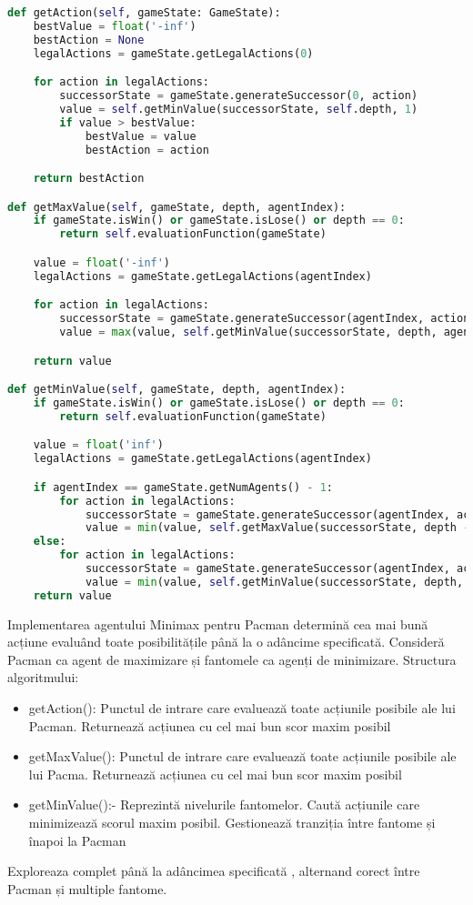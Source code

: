 \documentclass[12pt,a4paper]{article}
\begin{document}
\begin{lstlisting}[language=Python]
def getAction(self, gameState: GameState):
    bestValue = float('-inf')
    bestAction = None
    legalActions = gameState.getLegalActions(0)

    for action in legalActions:
        successorState = gameState.generateSuccessor(0, action)
        value = self.getMinValue(successorState, self.depth, 1)
        if value > bestValue:
            bestValue = value
            bestAction = action

    return bestAction

def getMaxValue(self, gameState, depth, agentIndex):
    if gameState.isWin() or gameState.isLose() or depth == 0:
        return self.evaluationFunction(gameState)

    value = float('-inf')
    legalActions = gameState.getLegalActions(agentIndex)

    for action in legalActions:
        successorState = gameState.generateSuccessor(agentIndex, action)
        value = max(value, self.getMinValue(successorState, depth, agentIndex + 1))

    return value

def getMinValue(self, gameState, depth, agentIndex):
    if gameState.isWin() or gameState.isLose() or depth == 0:
        return self.evaluationFunction(gameState)

    value = float('inf')
    legalActions = gameState.getLegalActions(agentIndex)

    if agentIndex == gameState.getNumAgents() - 1:
        for action in legalActions:
            successorState = gameState.generateSuccessor(agentIndex, action)
            value = min(value, self.getMaxValue(successorState, depth - 1, 0))
    else:
        for action in legalActions:
            successorState = gameState.generateSuccessor(agentIndex, action)
            value = min(value, self.getMinValue(successorState, depth, agentIndex + 1))
    return value
\end{lstlisting}

Implementarea agentului Minimax pentru Pacman determină cea mai bună acțiune evaluând toate 
posibilitățile până la o adâncime specificată. Consideră Pacman ca agent de maximizare și 
fantomele ca agenți de minimizare.
Structura algoritmului:
\begin{itemize}
    \item getAction(): Punctul de intrare care evaluează toate acțiunile posibile ale lui Pacman. Returnează acțiunea cu cel mai bun scor maxim posibil
    \item getMaxValue(): Punctul de intrare care evaluează toate acțiunile posibile ale lui Pacma. Returnează acțiunea cu cel mai bun scor maxim posibil
    \item getMinValue():- Reprezintă nivelurile fantomelor. Caută acțiunile care minimizează scorul maxim posibil. Gestionează tranziția între fantome și înapoi la Pacman
\end{itemize}
Exploreaza complet până la adâncimea specificată , alternand corect între Pacman și multiple fantome.
\end{document}
